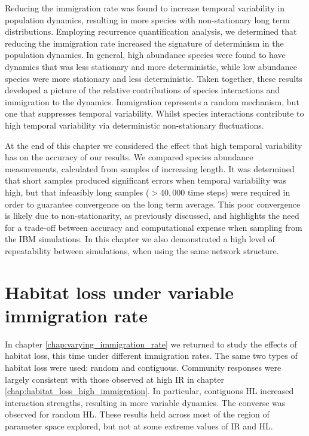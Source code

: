 Reducing the immigration rate was found to increase temporal variability in population dynamics, resulting in more species with non-stationary long term distributions. Employing recurrence quantification analysis, we determined that reducing the immigration rate increased the signature of determinism in the population dynamics. In general, high abundance species were found to have dynamics that was less stationary and more deterministic, while low abundance species were more stationary and less deterministic. Taken together, these results developed a picture of the relative contributions of species interactions and immigration to the dynamics. Immigration represents a random mechanism, but one that suppresses temporal variability. Whilst species interactions contribute to high temporal variability via deterministic non-stationary fluctuations. 

At the end of this chapter we considered the effect that high temporal variability has on the accuracy of our results. We compared species abundance measurements, calculated from samples of increasing length. It was determined that short samples produced significant errors when temporal variability was high, but that infeasibly long samples ($>40,000$ time steps) were required in order to guarantee convergence on the long term average. This poor convergence is likely due to non-stationarity, as previously discussed, and highlights the need for a trade-off between accuracy and computational expense when sampling from the IBM simulations. In this chapter we also demonstrated a high level of repeatability between simulations, when using the same network structure. 

\section{Habitat loss under variable immigration rate}
\label{sec:hl_var}

In chapter \ref{chap:varying_immigration_rate} we returned to study the effects of habitat loss, this time under different immigration rates. The same two types of habitat loss were used: random and contiguous. Community responses were largely consistent with those observed at high IR in chapter \ref{chap:habitat_loss_high_immigration}. In particular, contiguous HL increased interaction strengths, resulting in more variable dynamics. The converse was observed for random HL. These results held across most of the region of parameter space explored, but not at some extreme values of IR and HL. 

